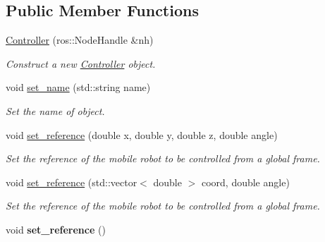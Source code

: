 \subsection*{Public Member Functions}
\begin{DoxyCompactItemize}
\item 
\hyperlink{classController_a7341f9092e1977cdd2a1492c4422c019}{Controller} (ros\+::\+Node\+Handle \&nh)
\begin{DoxyCompactList}\small\item\em Construct a new \hyperlink{classController}{Controller} object. \end{DoxyCompactList}\item 
void \hyperlink{classController_a88f2d54fedd04bd767e4d6e36e6dc2b3}{set\+\_\+name} (std\+::string name)
\begin{DoxyCompactList}\small\item\em Set the name of object. \end{DoxyCompactList}\item 
void \hyperlink{classController_ade57ae23226a7565521694c87ec79c90}{set\+\_\+reference} (double x, double y, double z, double angle)
\begin{DoxyCompactList}\small\item\em Set the reference of the mobile robot to be controlled from a global frame. \end{DoxyCompactList}\item 
void \hyperlink{classController_aefad16ae5d5df8baac0ed044018eb6c6}{set\+\_\+reference} (std\+::vector$<$ double $>$ coord, double angle)
\begin{DoxyCompactList}\small\item\em Set the reference of the mobile robot to be controlled from a global frame. \end{DoxyCompactList}\item 
void {\bfseries set\+\_\+reference} ()\hypertarget{classController_a3a417d33a8ecc6e83f3c43e3a4da74cd}{}\label{classController_a3a417d33a8ecc6e83f3c43e3a4da74cd}


\end{DoxyCompactItemize}
